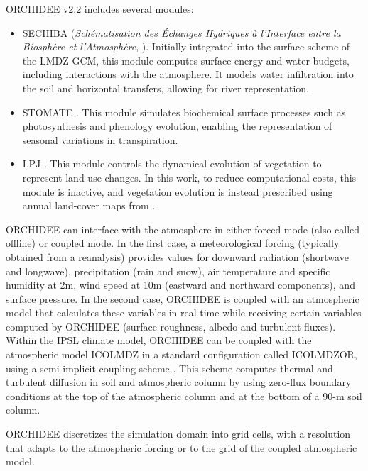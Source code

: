 ORCHIDEE v2.2 includes several modules:
\begin{itemize}
    \item SECHIBA (\textit{Schématisation des Échanges Hydriques à l’Interface entre la Biosphère et l’Atmosphère}, \cite{ducoudre_sechiba_1993}). Initially integrated into the surface scheme of the LMDZ GCM, this module computes surface energy and water budgets, including interactions with the atmosphere. It models water infiltration into the soil and horizontal transfers, allowing for river representation.
    \item STOMATE \citep{krinner_dynamic_2005}. This module simulates biochemical surface processes such as photosynthesis and phenology evolution, enabling the representation of seasonal variations in transpiration.
    \item LPJ \citep{sitch_evaluation_2003}. This module controls the dynamical evolution of vegetation to represent land-use changes. In this work, to reduce computational costs, this module is inactive, and vegetation evolution is instead prescribed using annual land-cover maps from \citet{belward1999igbp}.%
\end{itemize}

ORCHIDEE can interface with the atmosphere in either forced mode (also called offline) or coupled mode. 
In the first case, a meteorological forcing (typically obtained from a reanalysis) provides values for downward radiation (shortwave and longwave), precipitation (rain and snow), air temperature and specific humidity at 2m, wind speed at 10m (eastward and northward components), and surface pressure. 
In the second case, ORCHIDEE is coupled with an atmospheric model that calculates these variables in real time while receiving certain variables computed by ORCHIDEE (surface roughness, albedo and turbulent fluxes). %
Within the IPSL climate model, ORCHIDEE can be coupled with the atmospheric model ICOLMDZ in a standard configuration called ICOLMDZOR, using a semi-implicit coupling scheme \citep{polcher_proposal_1998}. This scheme computes thermal and turbulent diffusion in soil and atmospheric column by using zero-flux boundary conditions at the top of the atmospheric column and at the bottom of a 90-m soil column.%

ORCHIDEE discretizes the simulation domain into grid cells, with a resolution that adapts to the atmospheric forcing or to the grid of the coupled atmospheric model.

